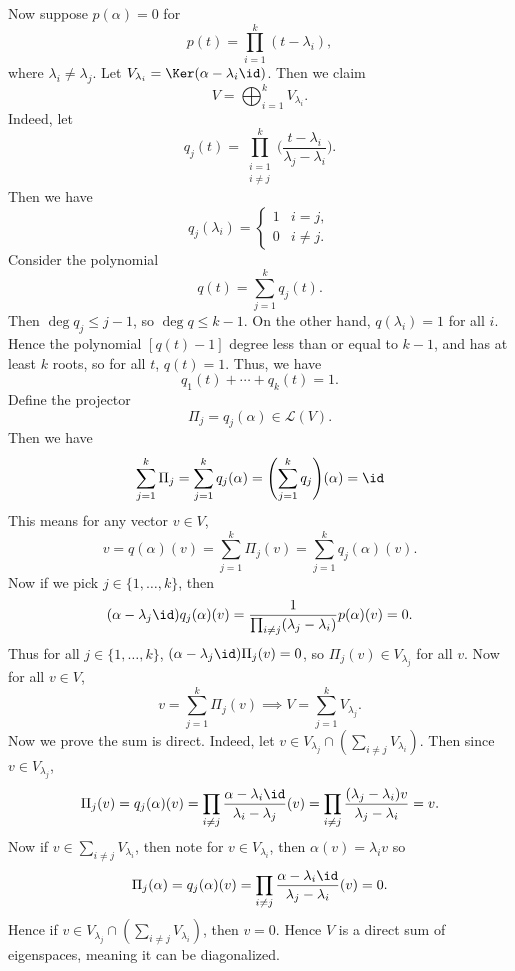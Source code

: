 \documentclass[12pt]{article}
\begin{document}
\begin{proofbox}
	Now suppose $p(\alpha) = 0$ for 
	\[
		p(t) = \prod_{i = 1}^{k}(t - \lambda_i)
	,\]
	where $\lambda_i \neq \lambda_j$. Let $V_{\lambda_i} = \Ker(\alpha - \lambda_i \id)$. Then we claim
	\[
	V = \bigoplus_{i = 1}^{k} V_{\lambda_i}
	.\]
	Indeed, let
	\[
		q_j(t) = \prod_{\substack{i = 1 \\i \neq j}}^{k} \biggl( \frac{t - \lambda_i}{\lambda_j- \lambda_i} \biggr)
	.\]
	Then we have
	\[
		q_j(\lambda_i) =
		\begin{cases}
			1 & i = j, \\
			0 & i \neq j.
		\end{cases}
	\]
	Consider the polynomial
	\[
		q(t) = \sum_{j = 1}^{k} q_j(t)
	.\]
	Then $\deg q_j \leq j-1$, so $\deg q \leq k-1$. On the other hand, $q(\lambda_i) = 1$ for all $i$. Hence the polynomial $[q(t) - 1]$ degree less than or equal to $k-1$, and has at least $k$ roots, so for all $t$, $q(t) = 1$. Thus, we have
	\[
		q_1(t) + \cdots + q_k(t) = 1
	.\]
	Define the projector
	\[
		\Pi_j = q_j(\alpha) \in \mathcal{L}(V)
	.\]
	Then we have
	\begin{align*}
		\sum_{j = 1}^{k} \Pi_j = \sum_{j = 1}^{k} q_j(\alpha) = \Biggl( \sum_{j = 1}^{k} q_j \Biggr) (\alpha) = \id
	\end{align*}
	This means for any vector $v \in V$,
	\[
		v = q(\alpha)(v) = \sum_{j = 1}^{k} \Pi_j(v) = \sum_{j = 1}^{k} q_j(\alpha)(v)
	.\]
	Now if we pick $j \in \{1, \ldots, k\}$, then
	 \[
		 (\alpha - \lambda_j \id) q_j(\alpha)(v) = \frac{1}{\prod_{i \neq j}(\lambda_j - \lambda_i)} p(\alpha)(v) = 0
	.\]
	Thus for all $j \in \{1, \ldots, k\}$, $(\alpha - \lambda_j \id)\Pi_j(v) = 0$, so $\Pi_j(v) \in V_{\lambda_j}$ for all $v$. Now for all $v \in V$,
	\[
		v = \sum_{j = 1}^{k} \Pi_j(v) \implies V = \sum_{j = 1}^{k}V_{\lambda_j}.
	\]
	Now we prove the sum is direct. Indeed, let $v \in V_{\lambda_j} \cap (\sum_{i \neq j} V_{\lambda_i})$. Then since $v \in V_{\lambda_j}$,
	\[
		\Pi_j(v) = q_j(\alpha)(v) = \prod_{i \neq j} \frac{\alpha - \lambda_i \id}{\lambda_i - \lambda_j} (v) = \prod_{i \neq j} \frac{(\lambda_j - \lambda_i)v}{\lambda_j - \lambda_i} = v
	.\]
	Now if $v \in \sum_{i \neq j} V_{\lambda_i}$, then note for $v \in V_{\lambda_i}$, then $\alpha(v) = \lambda_i v$ so
	\[
		\Pi_j(\alpha) = q_j(\alpha)(v) = \prod_{i \neq j} \frac{\alpha - \lambda_i \id}{\lambda_j - \lambda_i}(v) = 0
	.\]
	Hence if $v \in V_{\lambda_j}\cap (\sum_{i \neq j} V_{\lambda_i})$, then $v = 0$. Hence $V$ is a direct sum of eigenspaces, meaning it can be diagonalized.
\end{proofbox}
\end{document}
